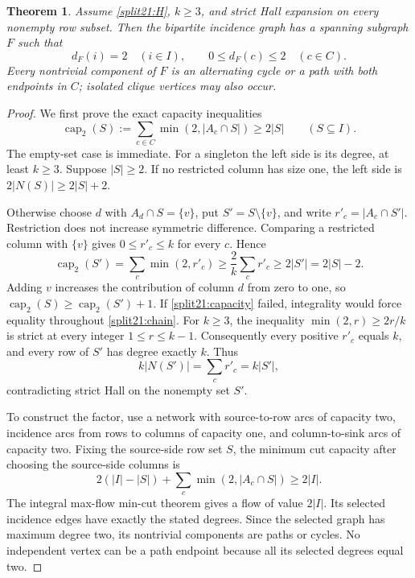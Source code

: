 \documentclass[11pt,a4paper]{article}
\newtheorem{theorem}{Theorem}[section]
\theoremstyle{definition}\newtheorem{definition}[theorem]{Definition}
\theoremstyle{remark}\newtheorem{remark}[theorem]{Remark}
\begin{document}
\begin{theorem}\label{split21:factor}
Assume \eqref{split21:H}, $k\geq3$, and strict Hall expansion on every nonempty
row subset. Then the bipartite incidence graph has a spanning subgraph $F$
such that
\[
 d_F(i)=2\quad(i\in I),\qquad 0\leq d_F(c)\leq2\quad(c\in C).
\]
Every nontrivial component of $F$ is an alternating cycle or a path with
both endpoints in $C$; isolated clique vertices may also occur.
\end{theorem}
\begin{proof}
We first prove the exact capacity inequalities
\begin{equation}\label{split21:capacity}
 \operatorname{cap}_2(S):=\sum_{c\in C}\min(2,|A_c\cap S|)\geq2|S|
 \qquad(S\subseteq I).
\end{equation}
The empty-set case is immediate. For a singleton the left side is its
degree, at least $k\geq3$. Suppose $|S|\geq2$. If no restricted column
has size one, the left side is $2|N(S)|\geq2|S|+2$.

Otherwise choose $d$ with $A_d\cap S=\{v\}$, put $S'=S\setminus\{v\}$,
and write $r'_c=|A_c\cap S'|$. Restriction does not increase symmetric
difference. Comparing a restricted column with $\{v\}$ gives
$0\leq r'_c\leq k$ for every $c$. Hence
\begin{equation}\label{split21:chain}
 \operatorname{cap}_2(S')=\sum_c\min(2,r'_c)
 \geq\frac2k\sum_c r'_c\geq2|S'|=2|S|-2.
\end{equation}
Adding $v$ increases the contribution of column $d$ from zero to one,
so $\operatorname{cap}_2(S)\geq\operatorname{cap}_2(S')+1$. If \eqref{split21:capacity} failed, integrality
would force equality throughout \eqref{split21:chain}. For $k\geq3$, the inequality
$\min(2,r)\geq2r/k$ is strict at every integer $1\leq r\leq k-1$.
Consequently every positive $r'_c$ equals $k$, and every row of $S'$ has
degree exactly $k$. Thus
\[
 k|N(S')|=\sum_c r'_c=k|S'|,
\]
contradicting strict Hall on the nonempty set $S'$.

To construct the factor, use a network with source-to-row arcs of capacity
two, incidence arcs from rows to columns of capacity one, and column-to-sink
arcs of capacity two. Fixing the source-side row set $S$, the minimum cut
capacity after choosing the source-side columns is
\[
 2(|I|-|S|)+\sum_c\min(2,|A_c\cap S|)\geq2|I|.
\]
The integral max-flow min-cut theorem \cite{src:fordfulkerson} gives a flow
of value $2|I|$. Its selected incidence edges have exactly the stated
degrees. Since the selected graph has maximum degree two, its nontrivial
components are paths or cycles. No independent vertex can be a path
endpoint because all its selected degrees equal two.
\end{proof}
\end{document}
